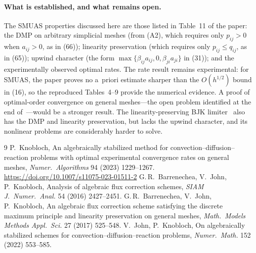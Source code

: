 \documentclass[11pt]{article}
\begin{document}
\paragraph{What is established, and what remains open.} The SMUAS properties discussed here are those listed in
Table~11 of the paper: the DMP on arbitrary simplicial meshes (from (A2), which requires only $p_{ij}>0$ when
$a_{ij}>0$, as in (66)); linearity preservation (which requires only $p_{ij}\le q_{ij}$, as in (65)); upwind
character (the form $\max\{\beta_{ij}a_{ij},0,\beta_{ji}a_{ji}\}$ in (31)); and the experimentally observed optimal
rates. The rate result remains experimental: for SMUAS, the paper proves no a~priori estimate sharper than the
$O(h^{1/2})$ bound in (16), so the reproduced Tables~4--9 provide the numerical evidence. A proof of optimal-order
convergence on general meshes—the open problem identified at the end of~\cite{Kn23}—would be a stronger result.
The linearity-preserving BJK limiter~\cite{BJK17} also has the DMP and linearity preservation, but lacks the upwind
character, and its nonlinear problems are considerably harder to solve.

\begin{thebibliography}{9}
 P.~Knobloch, An algebraically stabilized method for convection--diffusion--reaction problems with
  optimal experimental convergence rates on general meshes, \emph{Numer.\ Algorithms} 94 (2023) 1229--1267.
  \url{https://doi.org/10.1007/s11075-023-01511-2}
 G.\,R.~Barrenechea, V.~John, P.~Knobloch, Analysis of algebraic flux correction schemes,
  \emph{SIAM J.\ Numer.\ Anal.} 54 (2016) 2427--2451.
 G.\,R.~Barrenechea, V.~John, P.~Knobloch, An algebraic flux correction scheme satisfying the discrete
  maximum principle and linearity preservation on general meshes, \emph{Math.\ Models Methods Appl.\ Sci.} 27 (2017)
  525--548.
 V.~John, P.~Knobloch, On algebraically stabilized schemes for convection--diffusion--reaction problems,
  \emph{Numer.\ Math.} 152 (2022) 553--585.
\end{thebibliography}
\end{document}
